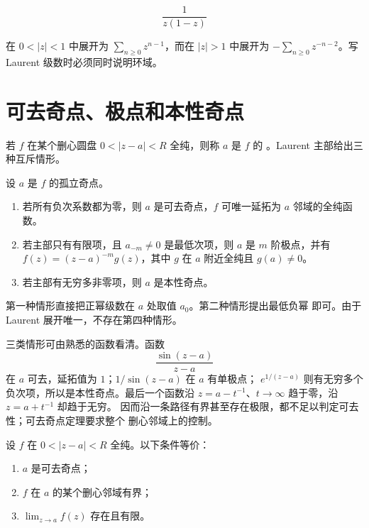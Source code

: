 \[
 \frac1{z(1-z)}
\]

在 \(0<|z|<1\) 中展开为
\(\sum_{n\ge0}z^{n-1}\)，而在 \(|z|>1\) 中展开为
\(-\sum_{n\ge0}z^{-n-2}\)。写 Laurent 级数时必须同时说明环域。

\section{可去奇点、极点和本性奇点}

若 \(f\) 在某个删心圆盘 \(0<|z-a|<R\) 全纯，则称 \(a\) 是 \(f\) 的
。Laurent 主部给出三种互斥情形。

\begin{theorem}[孤立奇点分类]
\label{thm:isolated-singularity-classification}
设 \(a\) 是 \(f\) 的孤立奇点。

\begin{enumerate}[label=(\roman*)]
 \item 若所有负次系数都为零，则 \(a\) 是可去奇点，\(f\) 可唯一延拓为
       \(a\) 邻域的全纯函数。
 \item 若主部只有有限项，且 \(a_{-m}\ne0\) 是最低次项，则 \(a\) 是
       \(m\) 阶极点，并有
       \(f(z)=(z-a)^{-m}g(z)\)，其中 \(g\) 在 \(a\) 附近全纯且
       \(g(a)\ne0\)。
 \item 若主部有无穷多非零项，则 \(a\) 是本性奇点。
\end{enumerate}
\end{theorem}

第一种情形直接把正幂级数在 \(a\) 处取值 \(a_0\)。第二种情形提出最低负幂
即可。由于 Laurent 展开唯一，不存在第四种情形。

三类情形可由熟悉的函数看清。函数
\[
 \frac{\sin(z-a)}{z-a}
\]
在 \(a\) 可去，延拓值为 \(1\)；\(1/\sin(z-a)\) 在 \(a\) 有单极点；
\(e^{1/(z-a)}\) 则有无穷多个负次项，所以是本性奇点。最后一个函数沿
\(z=a-t^{-1}\)、\(t\to\infty\) 趋于零，沿 \(z=a+t^{-1}\) 却趋于无穷。
因而沿一条路径有界甚至存在极限，都不足以判定可去性；可去奇点定理要求整个
删心邻域上的控制。

\begin{theorem}
\label{thm:riemann-removable-singularity}
设 \(f\) 在 \(0<|z-a|<R\) 全纯。以下条件等价：

\begin{enumerate}[label=(\roman*)]
 \item \(a\) 是可去奇点；
 \item \(f\) 在 \(a\) 的某个删心邻域有界；
 \item \(\lim_{z\to a}f(z)\) 存在且有限。
\end{enumerate}
\end{theorem}

